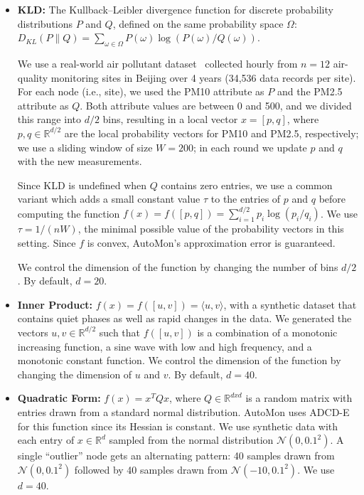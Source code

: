 \begin{itemize}[noitemsep, leftmargin=*]
\item \textbf{KLD:}
The Kullback–Leibler divergence function for discrete probability distributions $P$ and $Q$,
defined on the same probability space $\Omega$: $D_{KL}(P \| Q) = \sum_{\omega \in \Omega} P(\omega) \log \left( P(\omega) / Q(\omega) \right).$

We use a real-world air pollutant dataset~\cite{air_quality_dataset} collected hourly from $n=12$ air-quality monitoring sites in Beijing over 4 years (34,536 data records per site).
For each node (i.e., site), we used the PM10 attribute as $P$ and the PM2.5 attribute as $Q$.
Both attribute values are between 0 and 500, and we divided this range into $d/2$ bins, resulting in a local vector $x=[p,q]$, where $p,q \in \mathbb{R}^{d/2}$ are the local probability vectors for PM10 and PM2.5, respectively;
we use a sliding window of size $W=200$; 
in each round we update $p$ and $q$ with the new measurements.

Since KLD is undefined when $Q$ contains zero entries, we use a common variant which adds a small constant value $\tau$ to the entries of $p$ and $q$ before computing the function
$ f(x)=f([p, q]) = \sum_{i=1}^{d/2} p_i \log \left( p_i / q_i \right)$.
We use $\tau = 1 / \left( n W \right)$, the minimal possible value of the probability vectors in this setting.
Since $f$ is convex, AutoMon's approximation error is guaranteed.

We control the dimension of the function by changing the number of bins $d/2$.
By default, $d=20$.

\item \textbf{Inner Product:}
$f(x)=f([u,v]) = \langle u, v\rangle$, with a synthetic dataset that contains quiet phases as well as rapid changes in the data.
We generated the vectors $u, v \in \mathbb{R}^{d/2}$ such that $f([u,v])$ is a combination of a monotonic increasing function, a sine wave with low and high frequency, and a monotonic constant function.
We control the dimension of the function by changing the dimension of $u$ and $v$.
By default, $d=40$.

\item \textbf{Quadratic Form:}
$f(x) = x^T Q x$, where $Q \in \mathbb{R}^{dxd}$ is a random matrix with entries drawn from a standard normal distribution.
AutoMon uses ADCD-E for this function since its Hessian is constant.
We use synthetic data with each entry of $x \in \mathbb{R}^d$ sampled from the normal distribution $\mathcal{N} (0, 0.1^2)$.
A single ``outlier'' node gets an alternating pattern: 40 samples drawn from $\mathcal{N} (0, 0.1^2)$ followed by 40 samples drawn from $\mathcal{N} (-10, 0.1^2)$.
We use $d=40$.

\end{itemize}



